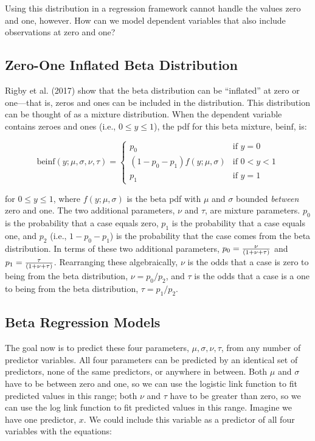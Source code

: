 \documentclass[english,man]{apa6}
\theoremstyle{definition}
\theoremstyle{definition}
\theoremstyle{remark}
\begin{document}
Using this distribution in a regression framework cannot handle the
values zero and one, however. How can we model dependent variables that
also include observations at zero and one?

\subsection{Zero-One Inflated Beta
Distribution}\label{zero-one-inflated-beta-distribution}

Rigby et al. (2017) show that the beta distribution can be
\enquote{inflated} at zero or one---that is, zeros and ones can be
included in the distribution. This distribution can be thought of as a
mixture distribution. When the dependent variable contains zeroes and
ones (i.e., \(0 \leq y \leq 1\)), the pdf for this beta mixture,
\(\text{beinf}\), is:

\begin{center}
\[
\text{beinf}(y;\mu,\sigma,\nu,\tau) =
\begin{cases}
  p_0                             & \text{if } y = 0\\
  (1 - p_0 - p_1)f(y;\mu,\sigma)  & \text{if } 0 < y < 1\\
  p_1                             & \text{if } y = 1
\end{cases}
\]
\end{center}

for \(0 \leq y \leq 1\), where \(f(y;\mu,\sigma)\) is the beta pdf with
\(\mu\) and \(\sigma\) bounded \emph{between} zero and one. The two
additional parameters, \(\nu\) and \(\tau\), are mixture parameters.
\(p_0\) is the probability that a case equals zero, \(p_1\) is the
probability that a case equals one, and \(p_2\) (i.e.,
\(1 - p_0 - p_1\)) is the probability that the case comes from the beta
distribution. In terms of these two additional parameters,
\(p_0 = {\nu \over (1 + \nu + \tau)}\) and
\(p_1 = {\tau \over (1 + \nu + \tau)}\). Rearranging these
algebraically, \(\nu\) is the odds that a case is zero to being from the
beta distribution, \(\nu = p_0 / p_2\), and \(\tau\) is the odds that a
case is a one to being from the beta distribution, \(\tau = p_1 / p_2\).

\subsection{Beta Regression Models}\label{beta-regression-models}

The goal now is to predict these four parameters,
\(\mu, \sigma, \nu, \tau\), from any number of predictor variables. All
four parameters can be predicted by an identical set of predictors, none
of the same predictors, or anywhere in between. Both \(\mu\) and
\(\sigma\) have to be between zero and one, so we can use the logistic
link function to fit predicted values in this range; both \(\nu\) and
\(\tau\) have to be greater than zero, so we can use the log link
function to fit predicted values in this range. Imagine we have one
predictor, \(x\). We could include this variable as a predictor of all
four variables with the equations:
\end{document}
